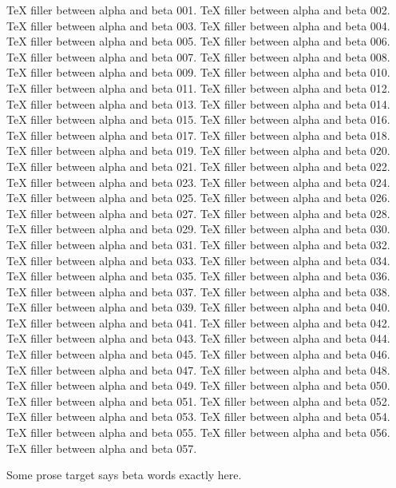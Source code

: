 TeX filler between alpha and beta 001.
TeX filler between alpha and beta 002.
TeX filler between alpha and beta 003.
TeX filler between alpha and beta 004.
TeX filler between alpha and beta 005.
TeX filler between alpha and beta 006.
TeX filler between alpha and beta 007.
TeX filler between alpha and beta 008.
TeX filler between alpha and beta 009.
TeX filler between alpha and beta 010.
TeX filler between alpha and beta 011.
TeX filler between alpha and beta 012.
TeX filler between alpha and beta 013.
TeX filler between alpha and beta 014.
TeX filler between alpha and beta 015.
TeX filler between alpha and beta 016.
TeX filler between alpha and beta 017.
TeX filler between alpha and beta 018.
TeX filler between alpha and beta 019.
TeX filler between alpha and beta 020.
TeX filler between alpha and beta 021.
TeX filler between alpha and beta 022.
TeX filler between alpha and beta 023.
TeX filler between alpha and beta 024.
TeX filler between alpha and beta 025.
TeX filler between alpha and beta 026.
TeX filler between alpha and beta 027.
TeX filler between alpha and beta 028.
TeX filler between alpha and beta 029.
TeX filler between alpha and beta 030.
TeX filler between alpha and beta 031.
TeX filler between alpha and beta 032.
TeX filler between alpha and beta 033.
TeX filler between alpha and beta 034.
TeX filler between alpha and beta 035.
TeX filler between alpha and beta 036.
TeX filler between alpha and beta 037.
TeX filler between alpha and beta 038.
TeX filler between alpha and beta 039.
TeX filler between alpha and beta 040.
TeX filler between alpha and beta 041.
TeX filler between alpha and beta 042.
TeX filler between alpha and beta 043.
TeX filler between alpha and beta 044.
TeX filler between alpha and beta 045.
TeX filler between alpha and beta 046.
TeX filler between alpha and beta 047.
TeX filler between alpha and beta 048.
TeX filler between alpha and beta 049.
TeX filler between alpha and beta 050.
TeX filler between alpha and beta 051.
TeX filler between alpha and beta 052.
TeX filler between alpha and beta 053.
TeX filler between alpha and beta 054.
TeX filler between alpha and beta 055.
TeX filler between alpha and beta 056.
TeX filler between alpha and beta 057.

Some prose target says beta words exactly here.

